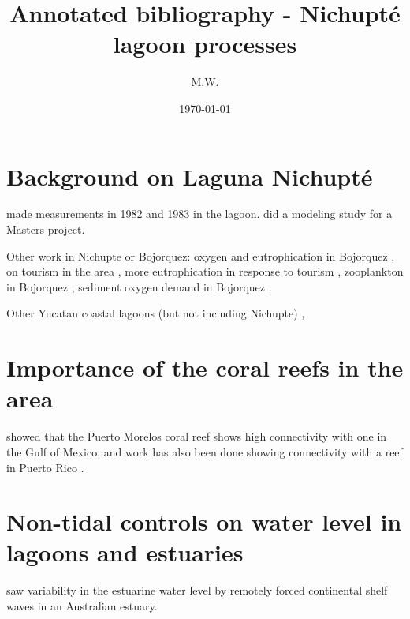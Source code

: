 \documentclass[11pt]{article}
\begin{document}
\title{Annotated bibliography - Nichupt{\'e} lagoon processes}
\author{M.W.}
\date{\today}
\maketitle

\section*{Background on Laguna Nichupt{\'e}}

\citet{merino90} made measurements in 1982 and 1983 in the lagoon. \citet{pedrozoacuna08} did a modeling study for a Masters project. 

Other work in Nichupte or Bojorquez: oxygen and eutrophication in Bojorquez \citep{reyes91}, on tourism in the area \citep{torres05}, more eutrophication in response to tourism \citep{merino92}, zooplankton in Bojorquez \citep{alvarezcadena96}, sediment oxygen demand in Bojorquez \citep{valdeslozano06}.

Other Yucatan coastal lagoons (but not including Nichupte) \citep{herrerasilveria98}, 


\section*{Importance of the coral reefs in the area}

\citet{villegassanchez14} showed that the Puerto Morelos coral reef shows high connectivity with one in the Gulf of Mexico, and work has also been done showing connectivity with a reef in Puerto Rico \citep{labastidaestrada14}.

\section*{Non-tidal controls on water level in lagoons and estuaries}

\citet{ocallaghan07} saw variability in the estuarine water level by remotely forced continental shelf waves in an Australian estuary.


{}

\end{document}
